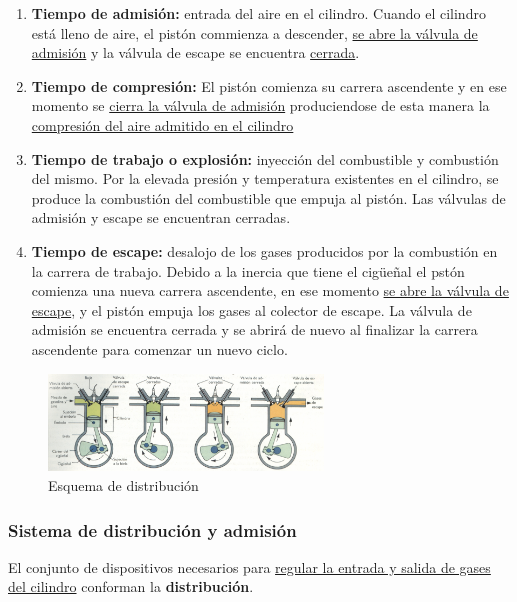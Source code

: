\documentclass[a4paper,12pt,oneside]{article}
\begin{document}
\begin{enumerate}
\item \textbf{Tiempo de admisión:} entrada del aire en el cilindro. Cuando el cilindro
está lleno de aire, el pistón commienza a descender, \uline{se abre la válvula de
admisión} y la válvula de escape se encuentra \uline{cerrada}.
\item \textbf{Tiempo de compresión:} El pistón comienza su carrera ascendente y en ese
momento se \uline{cierra la válvula de admisión} produciendose de esta manera la
\uline{compresión del aire admitido en el cilindro}
\item \textbf{Tiempo de trabajo o explosión:} inyección del combustible y combustión del
mismo. Por la elevada presión y temperatura existentes en el cilindro, se
produce la combustión del combustible que empuja al pistón. Las válvulas de
admisión y escape se encuentran cerradas.
\item \textbf{Tiempo de escape:} desalojo de los gases producidos por la combustión en la
carrera de trabajo. Debido a la inercia que tiene el cigüeñal el pstón
comienza una nueva carrera ascendente, en ese momento \uline{se abre la válvula de
escape}, y el pistón empuja los gases al colector de escape. La válvula de
admisión se encuentra cerrada y se abrirá de nuevo al finalizar la carrera
ascendente para comenzar un nuevo ciclo.
\end{enumerate}

\begin{center}
\begin{figure}[htbp]
\centering
\includegraphics[width=0.65\textwidth]{./img_0009/esquema_cuatrot.png}
\caption{Esquema de distribución}
\end{figure}
\end{center}

\subsubsection{Sistema de distribución y admisión}
\label{sec:orge7e9365}
El conjunto de dispositivos necesarios para \uline{regular la entrada y salida de 
gases del cilindro} conforman la \textbf{distribución}.
\end{document}
